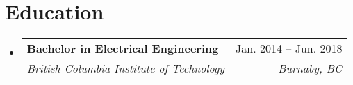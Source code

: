 \documentclass[letterpaper,11pt]{article}
\makeatletter
\newcommand{\resumeSubheading}[4]{
	\vspace{-1pt}\item
		\begin{tabular*}{0.97\textwidth}[t]{l@{\extracolsep{\fill}}r}
			\textbf{#1} & #2 \\
			\textit{\small#3} & \textit{\small #4} \\
		\end{tabular*}
	\vspace{-5pt}
}
\newcommand{\resumeSubHeadingListStart}{\begin{itemize}[leftmargin=*]}
\newcommand{\resumeSubHeadingListEnd}{\end{itemize}}
\makeatother
\begin{document}
\section{Education}
	\resumeSubHeadingListStart
		\resumeSubheading
			{Bachelor in Electrical Engineering}{Jan. 2014 -- Jun. 2018}
			{British Columbia Institute of Technology}{Burnaby, BC}
	\resumeSubHeadingListEnd

\end{document}
